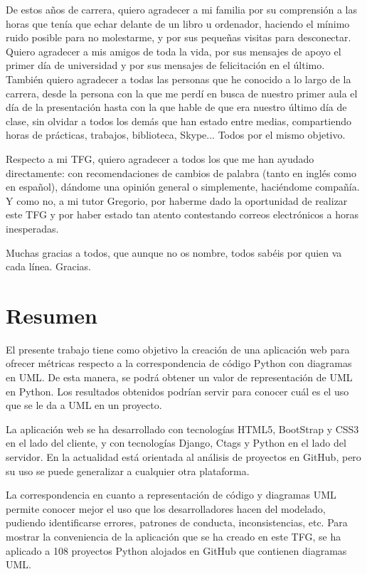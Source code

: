\documentclass[a4paper, 12pt]{book}
\begin{document}
De estos años de carrera, quiero agradecer a mi familia por su comprensión a las horas que tenía que echar delante de un libro u ordenador, haciendo el mínimo ruido posible para no molestarme, y por sus pequeñas visitas para desconectar.
Quiero agradecer a mis amigos de toda la vida, por sus mensajes de apoyo el primer día de universidad y por sus mensajes de felicitación en el último.
También quiero agradecer a todas las personas que he conocido a lo largo de la carrera, desde la persona con la que me perdí en busca de nuestro primer aula el día de la presentación hasta con la que hable de que era nuestro último día de clase, sin olvidar a todos los demás que han estado entre medias, compartiendo horas de prácticas, trabajos, biblioteca, Skype... Todos por el mismo objetivo.

Respecto a mi TFG, quiero agradecer a todos los que me han ayudado directamente: con recomendaciones de cambios de palabra (tanto en inglés como en español), dándome una opinión general o simplemente, haciéndome compañía.
Y como no, a mi tutor Gregorio, por haberme dado la oportunidad de realizar este TFG y por haber estado tan atento contestando correos electrónicos a horas inesperadas.

Muchas gracias a todos, que aunque no os nombre, todos sabéis por quien va cada línea. Gracias.


\chapter*{Resumen}

El presente trabajo tiene como objetivo la creación de una aplicación web para ofrecer métricas respecto a la correspondencia de código Python con diagramas en UML. De esta manera, se
podrá obtener un valor de representación de UML en Python. Los resultados obtenidos
podrían servir para conocer cuál es el uso que se le da a UML en un proyecto.

La aplicación web se ha desarrollado con tecnologías HTML5, BootStrap y CSS3
en el lado del cliente, y con tecnologías Django, Ctags y Python en el lado del servidor.
En la actualidad está orientada al análisis de proyectos en GitHub, pero su uso se puede generalizar a cualquier otra plataforma.

La correspondencia en cuanto a representación de código y diagramas UML permite conocer mejor el uso que los desarrolladores hacen del modelado, pudiendo identificarse errores, patrones de conducta, inconsistencias, etc. Para mostrar la conveniencia de la aplicación que se ha creado en este TFG, se ha aplicado a 108 proyectos Python alojados en GitHub que contienen diagramas UML.
\end{document}
